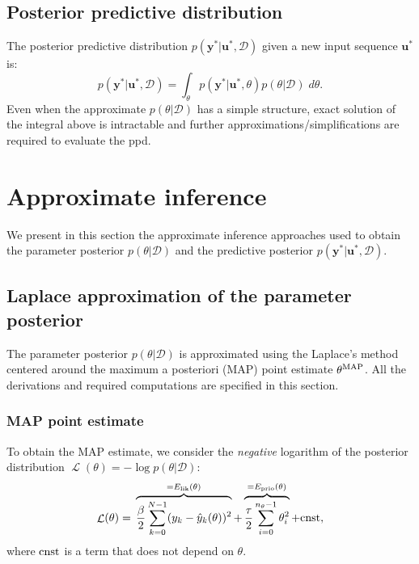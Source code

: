 \documentclass{article}
\DeclareMathOperator{\nll}{\mathcal{L}}
\newcommand{\nsamp}{N}
\newcommand{\npar}{{n_\theta}}
\newcommand{\MAP}{{\rm MAP}}
\newcommand{\tvec}[1]{{\mathbf{#1}}}
\newcommand{\mean}[1]{\hat{#1}}
\newcommand{\D}{\mathcal{D}} %
\begin{document}


\subsection{Posterior predictive distribution}
The posterior predictive distribution $p(\tvec{y}^* | \tvec{u}^*, \D)$ given a new input sequence $\tvec{u}^*$ is:%
\begin{equation}
\label{eq:posterior_predictive}
p(\tvec{y}^* | \tvec{u}^*, \D) = \int_{\theta} p(\tvec{y}^* | \tvec{u}^*, \theta) p(\theta | \D) \; d\theta.
\end{equation}
Even when the approximate $p(\theta | \D)$ has a simple structure, exact solution of the integral above is intractable and further approximations/simplifications are required to evaluate the ppd.

\section{Approximate inference}
We present in this section the approximate inference approaches used to obtain the parameter posterior $p(\theta | \D)$ and 
the predictive posterior $p(\tvec{y}^*| \tvec{u}^*, \D)$.
\subsection{Laplace approximation of the parameter posterior}
The parameter posterior $p(\theta | \D)$ is approximated using the Laplace's method \citep{bishop2006pattern} centered around the maximum a posteriori (MAP) point estimate  ${\theta^\MAP}$. All the derivations and required computations are specified in this section.
\subsubsection{MAP point estimate}
To obtain the MAP estimate, we consider the \emph{negative} logarithm of the posterior distribution $\nll(\theta) = - \log p(\theta | \D)$:
\begin{equation}
\label{eq:nll}
 \nll(\theta) = {} \overbrace{\frac{\beta}{2} \sum_{k=0}^{\nsamp-1} (y_k - \mean{y}_k(\theta))^2}^{=E_{\rm lik}(\theta)} +
 \overbrace{\frac{\tau}{2} \sum_{i=0}^{\npar-1} \theta_i^2}^{=E_{\rm prio}(\theta)}
 + \rm{cnst},
\end{equation}
where $\rm{cnst}$ is a term that does not depend on $\theta$.
\end{document}
